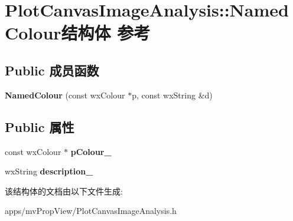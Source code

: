 \hypertarget{struct_plot_canvas_image_analysis_1_1_named_colour}{\section{Plot\+Canvas\+Image\+Analysis\+:\+:Named\+Colour结构体 参考}
\label{struct_plot_canvas_image_analysis_1_1_named_colour}
}
\subsection*{Public 成员函数}
\begin{DoxyCompactItemize}
\item 
\hypertarget{struct_plot_canvas_image_analysis_1_1_named_colour_ab541d8647b5c8d94892845f5c4eda643}{{\bfseries Named\+Colour} (const wx\+Colour $\ast$p, const wx\+String \&d)}\label{struct_plot_canvas_image_analysis_1_1_named_colour_ab541d8647b5c8d94892845f5c4eda643}

\end{DoxyCompactItemize}
\subsection*{Public 属性}
\begin{DoxyCompactItemize}
\item 
\hypertarget{struct_plot_canvas_image_analysis_1_1_named_colour_a1113cec55a1e8884ade3206b24b45206}{const wx\+Colour $\ast$ {\bfseries p\+Colour\+\_\+}}\label{struct_plot_canvas_image_analysis_1_1_named_colour_a1113cec55a1e8884ade3206b24b45206}

\item 
\hypertarget{struct_plot_canvas_image_analysis_1_1_named_colour_a6586782f2710b84a3a3b1b481fb67840}{wx\+String {\bfseries description\+\_\+}}\label{struct_plot_canvas_image_analysis_1_1_named_colour_a6586782f2710b84a3a3b1b481fb67840}

\end{DoxyCompactItemize}


该结构体的文档由以下文件生成\+:\begin{DoxyCompactItemize}
\item 
apps/mv\+Prop\+View/Plot\+Canvas\+Image\+Analysis.\+h\end{DoxyCompactItemize}
